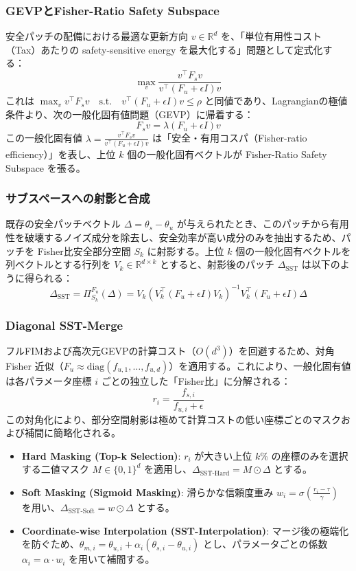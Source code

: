 \documentclass{article}
\begin{document}
\subsubsection{GEVPとFisher-Ratio Safety Subspace}
安全パッチの配備における最適な更新方向 $v \in \mathbb{R}^d$ を、「単位有用性コスト（Tax）あたりの safety-sensitive energy を最大化する」問題として定式化する：
\[ \max_v \frac{v^\top F_s v}{v^\top (F_u + \epsilon I) v} \]
これは $\max_v v^\top F_s v \quad \text{s.t.} \quad v^\top (F_u + \epsilon I) v \le \rho$ と同値であり、Lagrangianの極値条件より、次の一般化固有値問題（GEVP）に帰着する：
\[ F_s v = \lambda (F_u + \epsilon I) v \]
この一般化固有値 $\lambda = \frac{v^\top F_s v}{v^\top (F_u + \epsilon I) v}$ は「安全・有用コスパ（Fisher-ratio efficiency）」を表し、上位 $k$ 個の一般化固有ベクトルが Fisher-Ratio Safety Subspace を張る。

\subsubsection{サブスペースへの射影と合成}
既存の安全パッチベクトル $\Delta = \theta_s - \theta_u$ が与えられたとき、このパッチから有用性を破壊するノイズ成分を除去し、安全効率が高い成分のみを抽出するため、パッチを Fisher比安全部分空間 $S_k$ に射影する。上位 $k$ 個の一般化固有ベクトルを列ベクトルとする行列を $V_k \in \mathbb{R}^{d \times k}$ とすると、射影後のパッチ $\Delta_{\text{SST}}$ は以下のように得られる：
\[ \Delta_{\text{SST}} = \Pi_{S_k}^{F_u} (\Delta) = V_k (V_k^\top (F_u + \epsilon I) V_k)^{-1} V_k^\top (F_u + \epsilon I) \Delta \]

\subsubsection{Diagonal SST-Merge}
フルFIMおよび高次元GEVPの計算コスト（$O(d^3)$）を回避するため、対角 Fisher 近似（$F_u \approx \text{diag}(f_{u,1}, \dots, f_{u,d})$）を適用する。これにより、一般化固有値は各パラメータ座標 $i$ ごとの独立した「Fisher比」に分解される：
\[ r_i = \frac{f_{s,i}}{f_{u,i} + \epsilon} \]
この対角化により、部分空間射影は極めて計算コストの低い座標ごとのマスクおよび補間に簡略化される。
\begin{itemize}
    \item \textbf{Hard Masking (Top-k Selection)}: $r_i$ が大きい上位 $k$\% の座標のみを選択する二値マスク $M \in \{0, 1\}^d$ を適用し、$\Delta_{\text{SST-Hard}} = M \odot \Delta$ とする。
    \item \textbf{Soft Masking (Sigmoid Masking)}: 滑らかな信頼度重み $w_i = \sigma\left(\frac{r_i - \tau}{\gamma}\right)$ を用い、$\Delta_{\text{SST-Soft}} = w \odot \Delta$ とする。
    \item \textbf{Coordinate-wise Interpolation (SST-Interpolation)}: マージ後の極端化を防ぐため、$\theta_{m,i} = \theta_{u,i} + \alpha_i (\theta_{s,i} - \theta_{u,i})$ とし、パラメータごとの係数 $\alpha_i = \alpha \cdot w_i$ を用いて補間する。
\end{itemize}
\end{document}
